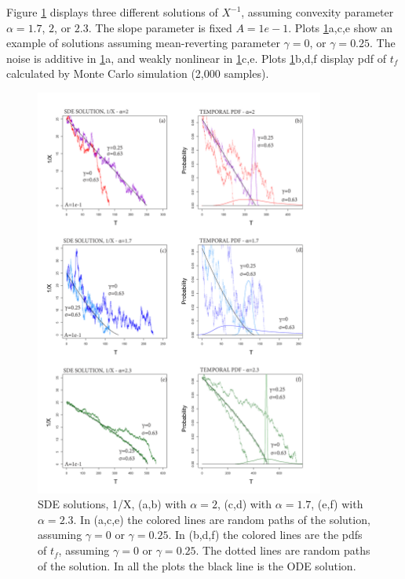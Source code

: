 \documentclass{article}
\begin{document}
Figure \ref{Fig2} displays three different solutions of $X^{-1}$, assuming convexity parameter $\alpha=1.7$, $2$, or $2.3$. The slope parameter is fixed $A=1e-1$. Plots \ref{Fig2}a,c,e show an example of solutions assuming mean-reverting parameter $\gamma=0$, or $\gamma=0.25$. The noise is additive in \ref{Fig2}a, and weakly nonlinear in \ref{Fig2}c,e. Plots \ref{Fig2}b,d,f display pdf of $t_f$ calculated by Monte Carlo simulation (2,000 samples).

\begin{figure}[H]\vskip-0.5cm
\centering
\includegraphics[width=0.85\textwidth]{Fig2_plus.png}
\caption{SDE solutions, 1/X, (a,b) with $\alpha=2$, (c,d) with $\alpha=1.7$, (e,f) with $\alpha=2.3$. In (a,c,e) the colored lines are random paths of the solution, assuming $\gamma=0$ or $\gamma=0.25$. In (b,d,f) the colored lines are the pdfs of $t_f$, assuming $\gamma=0$ or $\gamma=0.25$. The dotted lines are random paths of the solution. In all the plots the black line is the ODE solution.}
\label{Fig2}
\end{figure}
\end{document}
